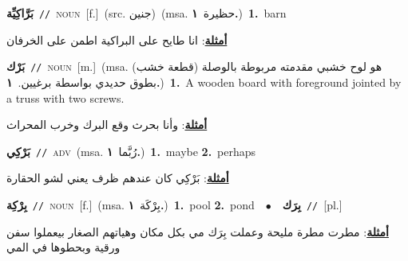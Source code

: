 \documentclass[10pt,a4paper,twoside]{article} %
\begin{document}
\begin{multicols}{2}
{\setlength\topsep{0pt}\textbf{\foreignlanguage{arabic}{بَرَّاكِيِّة}}\ {\color{gray}\texttt{//}\color{black}}\ \textsc{noun}\ [f.]\ (src. \color{gray}\foreignlanguage{arabic}{جنين}\color{black})\ \color{gray}(msa. \foreignlanguage{arabic}{حظيرة}~\foreignlanguage{arabic}{\textbf{١.}})\color{black}\ \textbf{1.}~barn\  \begin{flushright}\color{gray}\foreignlanguage{arabic}{\textbf{\underline{\foreignlanguage{arabic}{أمثلة}}}: انا طايح على البراكية اطمن على الخرفان}\end{flushright}\color{black}} \vspace{2mm}

{\setlength\topsep{0pt}\textbf{\foreignlanguage{arabic}{بَرْك}}\ {\color{gray}\texttt{//}\color{black}}\ \textsc{noun}\ [m.]\ \color{gray}(msa. \foreignlanguage{arabic}{هو لوح خشبي مقدمته مربوطة بالوصلة (قطعة خشب) بطوق حديدي بواسطة برغيين.}~\foreignlanguage{arabic}{\textbf{١.}})\color{black}\ \textbf{1.}~A wooden board with foreground jointed by a truss with two screws.\  \begin{flushright}\color{gray}\foreignlanguage{arabic}{\textbf{\underline{\foreignlanguage{arabic}{أمثلة}}}: وأنا بحرث وقع البرك وخرب المحراث}\end{flushright}\color{black}} \vspace{2mm}

{\setlength\topsep{0pt}\textbf{\foreignlanguage{arabic}{بَرْكِي}}\ {\color{gray}\texttt{//}\color{black}}\ \textsc{adv}\ \color{gray}(msa. \foreignlanguage{arabic}{رُبَّما}~\foreignlanguage{arabic}{\textbf{١.}})\color{black}\ \textbf{1.}~maybe  \textbf{2.}~perhaps\  \begin{flushright}\color{gray}\foreignlanguage{arabic}{\textbf{\underline{\foreignlanguage{arabic}{أمثلة}}}: بَرْكِي كان عندهم ظرف يعني لشو الحقارة}\end{flushright}\color{black}} \vspace{2mm}

{\setlength\topsep{0pt}\textbf{\foreignlanguage{arabic}{بِرْكِة}}\ {\color{gray}\texttt{//}\color{black}}\ \textsc{noun}\ [f.]\ \color{gray}(msa. \foreignlanguage{arabic}{بِرْكَة}~\foreignlanguage{arabic}{\textbf{١.}})\color{black}\ \textbf{1.}~pool  \textbf{2.}~pond\ \ $\bullet$\ \ \setlength\topsep{0pt}\textbf{\foreignlanguage{arabic}{بِرَك}}\ {\color{gray}\texttt{//}\color{black}}\ [pl.]\  \begin{flushright}\color{gray}\foreignlanguage{arabic}{\textbf{\underline{\foreignlanguage{arabic}{أمثلة}}}: مطرت مطرة مليحة وعملت بِرَك مي بكل مكان وهياتهم الصغار بيعملوا سفن ورقية وبحطوها في المي}\end{flushright}\color{black}} \vspace{2mm}


\end{multicols}
\end{document}
